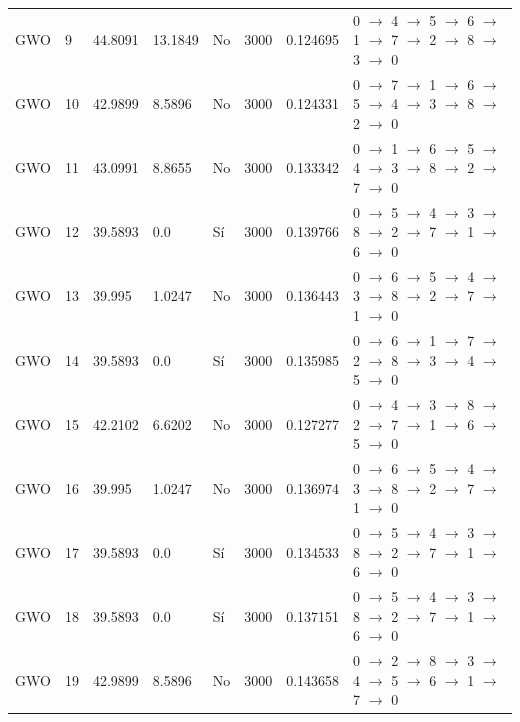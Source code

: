 \begin{table}[htbp]
\begin{tabular}{llllllll}
    GWO & 9 & 44.8091 & 13.1849 & No & 3000 & 0.124695 & 0 $\rightarrow$ 4 $\rightarrow$ 5 $\rightarrow$ 6 $\rightarrow$ 1 $\rightarrow$ 7 $\rightarrow$ 2 $\rightarrow$ 8 $\rightarrow$ 3 $\rightarrow$ 0 \\
    GWO & 10 & 42.9899 & 8.5896 & No & 3000 & 0.124331 & 0 $\rightarrow$ 7 $\rightarrow$ 1 $\rightarrow$ 6 $\rightarrow$ 5 $\rightarrow$ 4 $\rightarrow$ 3 $\rightarrow$ 8 $\rightarrow$ 2 $\rightarrow$ 0 \\
    GWO & 11 & 43.0991 & 8.8655 & No & 3000 & 0.133342 & 0 $\rightarrow$ 1 $\rightarrow$ 6 $\rightarrow$ 5 $\rightarrow$ 4 $\rightarrow$ 3 $\rightarrow$ 8 $\rightarrow$ 2 $\rightarrow$ 7 $\rightarrow$ 0 \\
    GWO & 12 & 39.5893 & 0.0 & Sí & 3000 & 0.139766 & 0 $\rightarrow$ 5 $\rightarrow$ 4 $\rightarrow$ 3 $\rightarrow$ 8 $\rightarrow$ 2 $\rightarrow$ 7 $\rightarrow$ 1 $\rightarrow$ 6 $\rightarrow$ 0 \\
    GWO & 13 & 39.995 & 1.0247 & No & 3000 & 0.136443 & 0 $\rightarrow$ 6 $\rightarrow$ 5 $\rightarrow$ 4 $\rightarrow$ 3 $\rightarrow$ 8 $\rightarrow$ 2 $\rightarrow$ 7 $\rightarrow$ 1 $\rightarrow$ 0 \\
    GWO & 14 & 39.5893 & 0.0 & Sí & 3000 & 0.135985 & 0 $\rightarrow$ 6 $\rightarrow$ 1 $\rightarrow$ 7 $\rightarrow$ 2 $\rightarrow$ 8 $\rightarrow$ 3 $\rightarrow$ 4 $\rightarrow$ 5 $\rightarrow$ 0 \\
    GWO & 15 & 42.2102 & 6.6202 & No & 3000 & 0.127277 & 0 $\rightarrow$ 4 $\rightarrow$ 3 $\rightarrow$ 8 $\rightarrow$ 2 $\rightarrow$ 7 $\rightarrow$ 1 $\rightarrow$ 6 $\rightarrow$ 5 $\rightarrow$ 0 \\
    GWO & 16 & 39.995 & 1.0247 & No & 3000 & 0.136974 & 0 $\rightarrow$ 6 $\rightarrow$ 5 $\rightarrow$ 4 $\rightarrow$ 3 $\rightarrow$ 8 $\rightarrow$ 2 $\rightarrow$ 7 $\rightarrow$ 1 $\rightarrow$ 0 \\
    GWO & 17 & 39.5893 & 0.0 & Sí & 3000 & 0.134533 & 0 $\rightarrow$ 5 $\rightarrow$ 4 $\rightarrow$ 3 $\rightarrow$ 8 $\rightarrow$ 2 $\rightarrow$ 7 $\rightarrow$ 1 $\rightarrow$ 6 $\rightarrow$ 0 \\
    GWO & 18 & 39.5893 & 0.0 & Sí & 3000 & 0.137151 & 0 $\rightarrow$ 5 $\rightarrow$ 4 $\rightarrow$ 3 $\rightarrow$ 8 $\rightarrow$ 2 $\rightarrow$ 7 $\rightarrow$ 1 $\rightarrow$ 6 $\rightarrow$ 0 \\
    GWO & 19 & 42.9899 & 8.5896 & No & 3000 & 0.143658 & 0 $\rightarrow$ 2 $\rightarrow$ 8 $\rightarrow$ 3 $\rightarrow$ 4 $\rightarrow$ 5 $\rightarrow$ 6 $\rightarrow$ 1 $\rightarrow$ 7 $\rightarrow$ 0 \\

\end{tabular}
\end{table}

